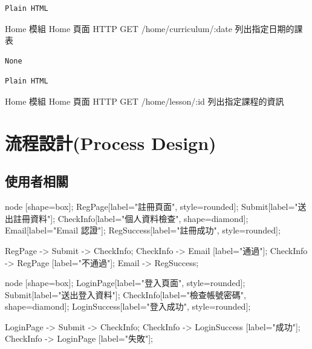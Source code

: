 \documentclass{article}
\begin{document}
\begin{lrbox}{\jsonoutputbox}
	\begin{lstlisting}
Plain HTML
\end{lstlisting}
\end{lrbox}

{Home 模組}
{Home 頁面}
{HTTP GET}
{/home/curriculum/:date}
{列出指定日期的課表}

\bigskip

\begin{lrbox}{\jsoninputbox}
	\begin{lstlisting}
None
\end{lstlisting}
\end{lrbox}

\begin{lrbox}{\jsonoutputbox}
	\begin{lstlisting}
Plain HTML
\end{lstlisting}
\end{lrbox}

{Home 模組}
{Home 頁面}
{HTTP GET}
{/home/lesson/:id}
{列出指定課程的資訊}

\newpage

\section[流程設計(PROCESS DESIGN)]{流程設計(Process Design)}

\subsection{使用者相關}

\begin{center}

	 {
		node [shape=box];
		RegPage[label="註冊頁面", style=rounded];
		Submit[label="送出註冊資料"];
		CheckInfo[label="個人資料檢查", shape=diamond];
		Email[label="Email 認證"];
		RegSuccess[label="註冊成功", style=rounded];

		RegPage -> Submit -> CheckInfo;
		CheckInfo -> Email [label="通過"];
		CheckInfo -> RegPage [label="不通過"];
		Email -> RegSuccess;
	}
\end{center}

\begin{center}

	 {
		node [shape=box];
		LoginPage[label="登入頁面", style=rounded];
		Submit[label="送出登入資料"];
		CheckInfo[label="檢查帳號密碼", shape=diamond];
		LoginSuccess[label="登入成功", style=rounded];

		LoginPage -> Submit -> CheckInfo;
		CheckInfo -> LoginSuccess [label="成功"];
		CheckInfo -> LoginPage [label="失敗"];
	}
\end{center}
\end{document}

